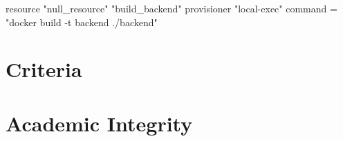 \documentclass{csse4400}
\begin{document}
\begin{code}{}
resource "null_resource" "build_backend" {
  provisioner "local-exec" {
    command = "docker build -t backend ./backend"
  }
}


\end{code}

\section{Criteria}

\section{Academic Integrity}

% 
% 
\end{document}
